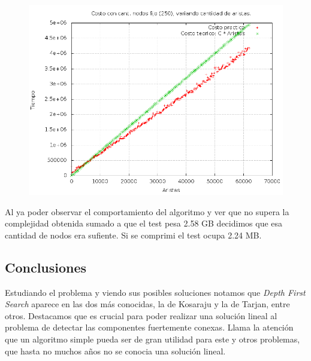 \begin{itemize}
\begin{itemize}
\begin{figure}[H]
	\centering
	\includegraphics[scale=0.6]{ej3-grafico2.png}
\end{figure}

\quad Al ya poder observar el comportamiento del algoritmo y ver que no supera la complejidad obtenida sumado a que el test pesa 2.58 GB decidimos que esa cantidad de nodos era sufiente. Si se comprimi el test ocupa 2.24 MB.


\end{itemize}
\end{itemize}

\subsection{Conclusiones}

\quad Estudiando el problema y viendo sus posibles soluciones notamos que \textit{Depth First Search} aparece en las dos más conocidas, la de Kosaraju y la de Tarjan, entre otros. Destacamos que es crucial para poder realizar una solución lineal al problema de detectar las componentes fuertemente conexas. Llama la atención que un algoritmo simple pueda ser de gran utilidad para este y otros problemas, que hasta no muchos años no se conocia una solución lineal.
